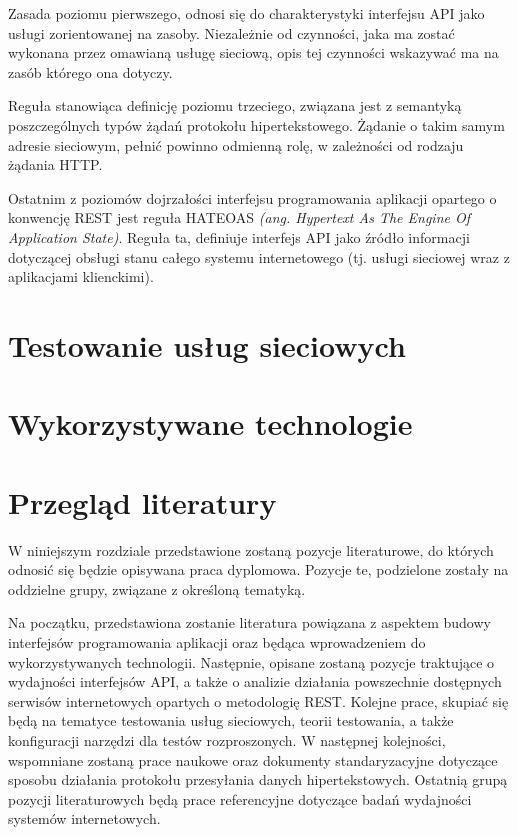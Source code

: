 Zasada poziomu pierwszego, odnosi się do charakterystyki interfejsu API jako usługi zorientowanej na zasoby. Niezależnie od czynności, jaka ma zostać wykonana przez omawianą usługę sieciową, opis tej czynności wskazywać ma na zasób którego ona dotyczy.

Reguła stanowiąca definicję poziomu trzeciego, związana jest z semantyką poszczególnych typów żądań protokołu hipertekstowego. Żądanie o takim samym adresie sieciowym, pełnić powinno odmienną rolę, w zależności od rodzaju żądania HTTP.

Ostatnim z poziomów dojrzałości interfejsu programowania aplikacji opartego o konwencję REST jest reguła HATEOAS \textit{(ang. Hypertext As The Engine Of Application State)}. Reguła ta, definiuje interfejs API jako źródło informacji dotyczącej obsługi stanu całego systemu internetowego (tj. usługi sieciowej wraz z aplikacjami klienckimi).

\section{Testowanie usług sieciowych}
\section{Wykorzystywane technologie}
\section{Przegląd literatury}
W niniejszym rozdziale przedstawione zostaną pozycje literaturowe, do których odnosić się będzie opisywana praca dyplomowa. Pozycje te, podzielone zostały na oddzielne grupy, związane z określoną tematyką.

Na początku, przedstawiona zostanie literatura powiązana z aspektem budowy interfejsów programowania aplikacji oraz będąca wprowadzeniem do wykorzystywanych technologii. Następnie, opisane zostaną pozycje traktujące o wydajności interfejsów API, a także o analizie działania powszechnie dostępnych serwisów internetowych opartych o metodologię REST. Kolejne prace, skupiać się będą na tematyce testowania usług sieciowych, teorii testowania, a także konfiguracji narzędzi dla testów rozproszonych. W następnej kolejności, wspomniane zostaną prace naukowe oraz dokumenty standaryzacyjne dotyczące sposobu działania protokołu przesyłania danych hipertekstowych. Ostatnią grupą pozycji literaturowych będą prace referencyjne dotyczące badań wydajności systemów internetowych.

